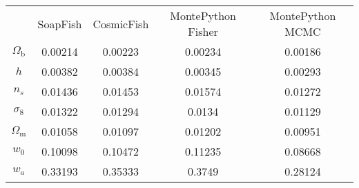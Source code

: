 \begin{table}
\centering
\begin{tabular}{|c|c|c|c|c|}
{} & {SoapFish} & {CosmicFish} & {MontePython Fisher} & {MontePython MCMC} \\
$\Omega_\mathrm{b}$ & 0.00214 & 0.00223 & 0.00234 & 0.00186 \\
$h$ & 0.00382 & 0.00384 & 0.00345 & 0.00293 \\
$n_s$ & 0.01436 & 0.01453 & 0.01574 & 0.01272 \\
$\sigma_8$ & 0.01322 & 0.01294 & 0.0134 & 0.01129 \\
$\Omega_\mathrm{m}$ & 0.01058 & 0.01097 & 0.01202 & 0.00951 \\
$w_0$ & 0.10098 & 0.10472 & 0.11235 & 0.08668 \\
$w_a$ & 0.33193 & 0.35333 & 0.3749 & 0.28124 \\
\end{tabular}
\end{table}

